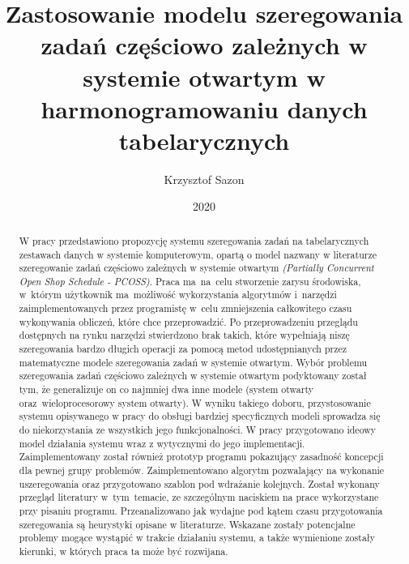 \documentclass[brudnopis]{xmgr}
\author   {Krzysztof Sazon}
\title    {Zastosowanie modelu szeregowania zadań częściowo zależnych w systemie otwartym w harmonogramowaniu danych tabelarycznych}
\date     {2020}
\begin{document}
\begin{abstract}
W pracy przedstawiono propozycję systemu szeregowania zadań na tabelarycznych zestawach danych w systemie komputerowym, opartą o model nazwany w literaturze szeregowanie zadań częściowo zależnych w systemie otwartym \emph{(Partially Concurrent Open Shop Schedule - PCOSS)}.
Praca ma~na~celu stworzenie zarysu środowiska, w~którym użytkownik ma~możliwość wykorzystania algorytmów i~narzędzi zaimplementowanych przez programistę w~celu zmniejszenia całkowitego czasu wykonywania obliczeń, które chce przeprowadzić.
Po przeprowadzeniu przeglądu dostępnych na rynku narzędzi stwierdzono brak takich, które wypełniają niszę szeregowania bardzo długich operacji za pomocą metod udostępnianych przez matematyczne modele szeregowania zadań w systemie otwartym.
Wybór problemu szeregowania zadań częściowo zależnych w systemie otwartym podyktowany został tym, że generalizuje on co najmniej dwa inne modele (system otwarty oraz~wieloprocesorowy system otwarty). W wyniku takiego doboru, przystosowanie systemu opisywanego w pracy do obsługi bardziej specyficznych modeli sprowadza się do niekorzystania ze wszystkich jego funkcjonalności.
W pracy przygotowano ideowy model działania systemu wraz z wytycznymi do jego implementacji.
Zaimplementowany został również prototyp programu pokazujący zasadność koncepcji dla pewnej grupy problemów.
Zaimplementowano algorytm pozwalający na wykonanie uszeregowania oraz przygotowano szablon pod wdrażanie kolejnych.
Został wykonany przegląd literatury w~tym~temacie, ze szczególnym naciskiem na prace wykorzystane przy pisaniu programu.
Przeanalizowano jak wydajne pod kątem czasu przygotowania szeregowania są heurystyki opisane w literaturze.
Wskazane zostały potencjalne problemy mogące wystąpić w trakcie działaniu systemu, a także wymienione zostały kierunki, w których praca ta może być rozwijana.
\end{abstract}




\maketitle
\end{document}

